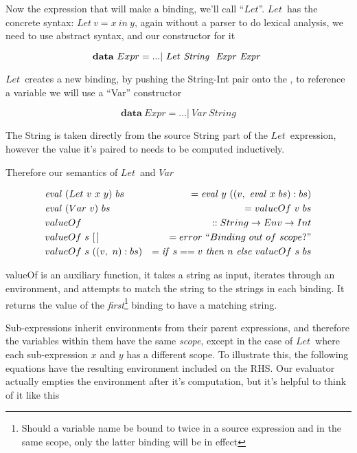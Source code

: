 \documentclass {article}
\begin{document}
\newcommand{\lets}{$Let$}
\newcommand{\var}{$Var$}

Now the expression that will make a binding,
we'll call ``\lets''.
\lets\ has the concrete syntax:
\( Let\ v = x\ in\ y\),
again without a parser to do
lexical analysis, we need to use
abstract syntax, and our constructor
for it

	\[ \textbf{data}\ Expr = ... |\ Let\ \String\ \Expr \Expr \]

\lets\ creates a new binding,
by pushing the String-Int pair
onto the \env, to reference a variable we will
use a ``Var'' constructor

\[ \textbf{data}\ Expr = ... |\ Var\ String \]

The String is taken directly from the source
String part of the \lets\ expression,
however the value it's paired to 
needs to be computed inductively.

Therefore our semantics of \lets\ and \var\

\begin{eqnarray*}
&\evalf  (Let\ v\ x\ y)\ bs &= \evalf  y\ ((v,\ \evalf  x\ bs):bs) \\
&\evalf  (Var\ v)\ bs		    &=   valueOf\ v\ bs  \\
&valueOf\ &:: String \rightarrow Env \rightarrow Int \\
&valueOf\ s\ [\, ]\ &= error\ ``Binding\ out\ of\ scope?" \\
&valueOf\ s\ ((v,\ n):bs) &= \ifff s == v\ \tthen n\ \eelse valueOf\ s\ bs
\end{eqnarray*}

valueOf is an auxiliary function,
it takes a string as input, iterates through an
environment, and attempts to match
the string to the strings in each binding.
It returns the value of the \emph{first}\footnote{
Should a variable name be bound to twice in a 
source expression and in the same scope,
only the latter binding will
be in effect} binding
to have a matching string. 
\linebreak

Sub-expressions inherit environments from their parent expressions,
and therefore the variables within them have the same \emph{scope},
except in the case of \lets\ where each sub-expression $x$ and $y$
has a different scope. 
To illustrate this, the following equations
have the resulting environment included on the RHS.
Our evaluator actually empties the environment 
after it's computation, 
but it's helpful to think of it like this
\end{document}
